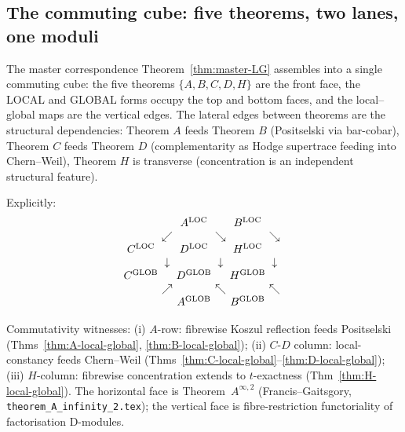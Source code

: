 \subsection*{The commuting cube: five theorems, two lanes, one moduli}

The master correspondence
Theorem~\ref{thm:master-LG} assembles into a single commuting cube:
the five theorems $\{A, B, C, D, H\}$ are the front face, the LOCAL
and GLOBAL forms occupy the top and bottom faces, and the
local--global maps are the vertical edges. The lateral edges between
theorems are the structural dependencies: Theorem $A$ feeds Theorem
$B$ (Positselski via bar-cobar), Theorem $C$ feeds Theorem $D$
(complementarity as Hodge supertrace feeding into Chern--Weil), Theorem
$H$ is transverse (concentration is an independent structural
feature).

Explicitly:
\[
\begin{array}{c@{\ }c@{\ }c@{\ }c@{\ }c@{\ }c@{\ }c}
   &            & A^{\mathrm{LOC}}   &            & B^{\mathrm{LOC}}   &            &                    \\
   & \swarrow   &                    & \searrow   &                    & \searrow   &                    \\
C^{\mathrm{LOC}}   &            & D^{\mathrm{LOC}}   &            & H^{\mathrm{LOC}}   &            &                    \\
   & \downarrow &                    & \downarrow &                    & \downarrow &                    \\
C^{\mathrm{GLOB}}  &            & D^{\mathrm{GLOB}}  &            & H^{\mathrm{GLOB}}  &            &                    \\
   & \nearrow   &                    & \nwarrow   &                    & \nwarrow   &                    \\
   &            & A^{\mathrm{GLOB}}  &            & B^{\mathrm{GLOB}}  &            &                    \\
\end{array}
\]

Commutativity witnesses: (i) $A$-row: fibrewise Koszul reflection
feeds Positselski (Thms~\ref{thm:A-local-global},
\ref{thm:B-local-global}); (ii) $C$-$D$ column: local-constancy
feeds Chern--Weil (Thms~\ref{thm:C-local-global}--\ref{thm:D-local-global});
(iii) $H$-column: fibrewise concentration extends to
$t$-exactness (Thm~\ref{thm:H-local-global}). The horizontal face is
Theorem~$A^{\infty, 2}$ (Francis--Gaitsgory,
\texttt{theorem\_A\_infinity\_2.tex}); the vertical face is
fibre-restriction functoriality of factorisation D-modules.

